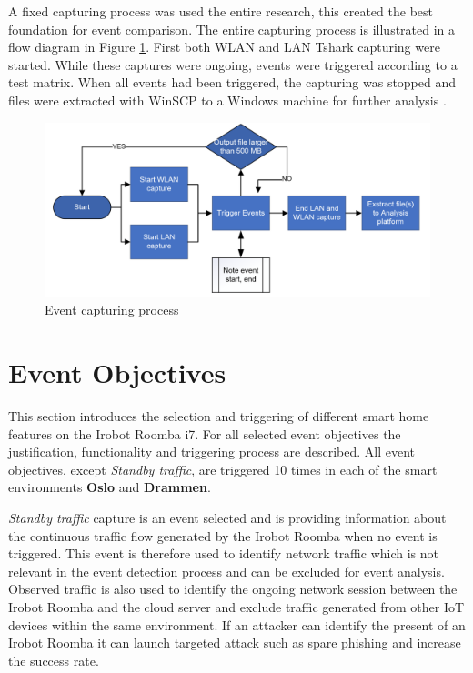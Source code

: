 A fixed capturing process was used the entire research, this created the best foundation for event comparison. The entire capturing process is illustrated in a flow diagram in Figure \ref{fig:captuingprocess}. First both \gls{WLAN} and \gls{LAN} Tshark capturing were started. While these captures were ongoing, events were triggered according to a test matrix. When all events had been triggered, the capturing was stopped and files were extracted with WinSCP to a Windows machine for further analysis \cite{winscp2023}.
  
\begin{figure}[H]
    \centering
    \includegraphics[width=\textwidth]{figures/Event triggering process.png}
    \caption{Event capturing process}
    \label{fig:captuingprocess}
\end{figure}

\section{Event Objectives}

This section introduces the selection and triggering of different smart home features on the Irobot Roomba i7. For all selected event objectives the justification, functionality and triggering process are described. All event objectives, except \textit{Standby traffic}, are triggered 10 times in each of the smart environments \textbf{Oslo} and \textbf{Drammen}.

\textit{Standby traffic} capture is an event selected and is providing information about the continuous traffic flow generated by the Irobot Roomba when no event is triggered. This event is therefore used to identify network traffic which is not relevant in the event detection process and can be excluded for event analysis. Observed traffic is also used to identify the ongoing network session between the Irobot Roomba and the cloud server and exclude traffic generated from other \gls{IoT} devices within the same environment. If an attacker can identify the present of an Irobot Roomba it can launch targeted attack such as spare phishing and increase the success rate. 

